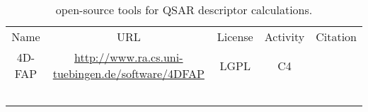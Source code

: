 \begin{table} 
    \begin{tabular}{ c c c c c }
     Name    & URL & License & Activity & Citation \\ 
     4D-FAP    &\url{http://www.ra.cs.uni-tuebingen.de/software/4DFAP} & LGPL & C4 & \cite{Jahn_2011,Jahn_2010} \\ 
         &  &  &  &  \\ 
         &  &  &  &  \\ 
         &  &  &  &  \\ 
         &  &  &  &  \\ 
         &  &  &  &  \\ 
    \end{tabular} 
    \caption{\label{qsartable} open-source tools for QSAR descriptor calculations.} 
\end{table}